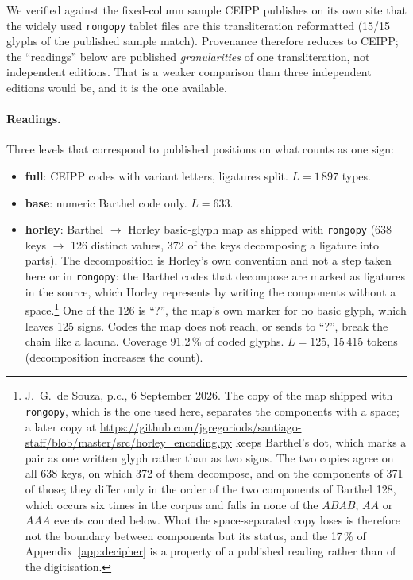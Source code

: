 \documentclass[11pt,a4paper]{article}
\begin{document}
We verified against the fixed-column sample CEIPP publishes on its own site that the widely used \texttt{rongopy} tablet files are this transliteration reformatted (15/15 glyphs of the published sample match). Provenance therefore reduces to CEIPP; the ``readings'' below are published \emph{granularities} of one transliteration, not independent editions. That is a weaker comparison than three independent editions would be, and it is the one available.

\paragraph{Readings.} Three levels that correspond to published positions on what counts as one sign:
\begin{itemize}
\item \textbf{full}: CEIPP codes with variant letters, ligatures split. $L=1\,897$ types.
\item \textbf{base}: numeric Barthel code only. $L=633$.
\item \textbf{horley}: Barthel $\to$ Horley basic-glyph map as shipped with \texttt{rongopy} (638 keys $\to$ 126 distinct values, 372 of the keys decomposing a ligature into parts). The decomposition is Horley's own convention and not a step taken here or in \texttt{rongopy}: the Barthel codes that decompose are marked as ligatures in the source, which Horley represents by writing the components without a space.\footnote{J.~G.~de Souza, p.c., 6 September 2026. The copy of the map shipped with \texttt{rongopy}, which is the one used here, separates the components with a space; a later copy at \url{https://github.com/jgregoriods/santiago-staff/blob/master/src/horley_encoding.py} keeps Barthel's dot, which marks a pair as one written glyph rather than as two signs. The two copies agree on all 638 keys, on which 372 of them decompose, and on the components of 371 of those; they differ only in the order of the two components of Barthel 128, which occurs six times in the corpus and falls in none of the $ABAB$, $AA$ or $AAA$ events counted below. What the space-separated copy loses is therefore not the boundary between components but its status, and the 17\,\% of Appendix~\ref{app:decipher} is a property of a published reading rather than of the digitisation.} One of the 126 is ``?'', the map's own marker for no basic glyph, which leaves 125 signs. Codes the map does not reach, or sends to ``?'', break the chain like a lacuna. Coverage 91.2\,\% of coded glyphs. $L=125$, 15\,415 tokens (decomposition increases the count).
\end{itemize}
\end{document}
